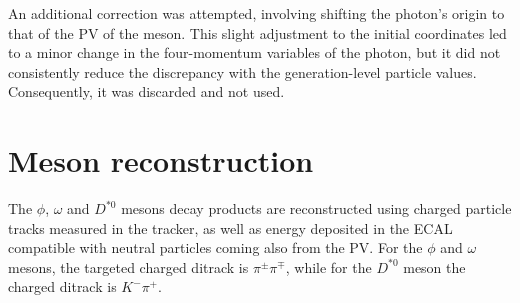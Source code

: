 \begin{myitemlist}
    An additional correction was attempted, involving shifting the photon's origin to that of the PV of the meson. This slight adjustment to the initial coordinates led to a minor change in the four-momentum variables of the photon, but it did not consistently reduce the discrepancy with the generation-level particle values. Consequently, it was discarded and not used.

\end{myitemlist}

\section{Meson reconstruction }\label{sec:meson_reconstruction}

The $\phi$, $\omega$ and $D^{*0}$ mesons decay products are reconstructed using charged particle tracks measured in the tracker, as well as energy deposited in the ECAL compatible with neutral particles coming also from the PV. For the $\phi$ and $\omega$ mesons, the targeted charged ditrack is $\pi^\pm\pi^\mp$, while for the $D^{*0}$ meson the charged ditrack is $K^{-}\pi^{+}$.

